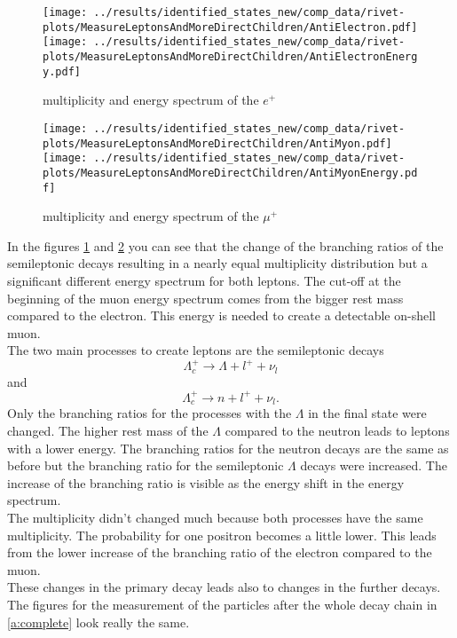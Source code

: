 \begin{figure}[h]
  \centering
  \texttt{[image: ../results/identified\_states\_new/comp\_data/rivet-plots/MeasureLeptonsAndMoreDirectChildren/AntiElectron.pdf]}
  \texttt{[image: ../results/identified\_states\_new/comp\_data/rivet-plots/MeasureLeptonsAndMoreDirectChildren/AntiElectronEnergy.pdf]}
  \caption{multiplicity and energy spectrum of the \(e^+\)} \label{gr:prim-ep}
\end{figure}
\begin{figure}[h]
  \centering
  \texttt{[image: ../results/identified\_states\_new/comp\_data/rivet-plots/MeasureLeptonsAndMoreDirectChildren/AntiMyon.pdf]}
  \texttt{[image: ../results/identified\_states\_new/comp\_data/rivet-plots/MeasureLeptonsAndMoreDirectChildren/AntiMyonEnergy.pdf]}
  \caption{multiplicity and energy spectrum of the \(\mu^+\)} \label{gr:prim-mup}
\end{figure}
In the figures {\ref{gr:prim-ep}} and {\ref{gr:prim-mup}} you can see that 
the change of the branching ratios of the semileptonic decays 
resulting in a nearly equal multiplicity distribution but a significant different 
energy spectrum for both leptons. The cut-off at the beginning of the muon 
energy spectrum comes from the bigger rest mass compared to the electron. 
This energy is needed to create a detectable on-shell muon.\\
The two main processes to create leptons are the semileptonic decays
\begin{equation}
  \Lambda_c^+ \rightarrow \Lambda + l^+ + \nu_l \nonumber
\end{equation} and 
\begin{equation}
  \Lambda_c^+ \rightarrow n+ l^+ + \nu_l. \nonumber
\end{equation}
Only the branching ratios for the processes with the \(\Lambda\) in the final state were changed. 
The higher rest mass of the \(\Lambda\) compared to the neutron leads to leptons 
with a lower energy. The branching ratios for the neutron decays are the same as 
before but the branching ratio for the semileptonic \(\Lambda\) decays were increased. 
The increase of the branching ratio is visible as the energy shift in the energy spectrum.\\
The multiplicity didn't changed much because both processes have the same 
multiplicity. The probability for one positron becomes a little lower. This 
leads from the lower increase of the branching ratio of the electron compared 
to the muon.\\
These changes in the primary decay leads also to changes in the further decays.
The figures for the measurement of the particles after the whole decay chain 
in {\ref{a:complete}} look really the same.\\

